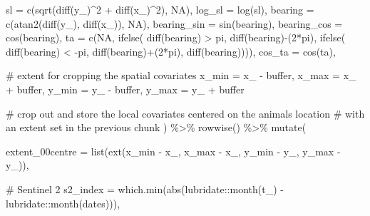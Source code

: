\documentclass[
  letterpaper,
  DIV=11,
  numbers=noendperiod]{scrartcl}
\newenvironment{Shaded}{\begin{snugshade}}{\end{snugshade}}
\newcommand{\AttributeTok}[1]{\textcolor[rgb]{0.40,0.45,0.13}{#1}}
\newcommand{\CommentTok}[1]{\textcolor[rgb]{0.37,0.37,0.37}{#1}}
\newcommand{\ConstantTok}[1]{\textcolor[rgb]{0.56,0.35,0.01}{#1}}
\newcommand{\DecValTok}[1]{\textcolor[rgb]{0.68,0.00,0.00}{#1}}
\newcommand{\FunctionTok}[1]{\textcolor[rgb]{0.28,0.35,0.67}{#1}}
\newcommand{\NormalTok}[1]{\textcolor[rgb]{0.00,0.23,0.31}{#1}}
\newcommand{\SpecialCharTok}[1]{\textcolor[rgb]{0.37,0.37,0.37}{#1}}
\begin{document}
\begin{Shaded}
\begin{Highlighting}[]
    \AttributeTok{sl =} \FunctionTok{c}\NormalTok{(}\FunctionTok{sqrt}\NormalTok{(}\FunctionTok{diff}\NormalTok{(y\_)}\SpecialCharTok{\^{}}\DecValTok{2} \SpecialCharTok{+} \FunctionTok{diff}\NormalTok{(x\_)}\SpecialCharTok{\^{}}\DecValTok{2}\NormalTok{), }\ConstantTok{NA}\NormalTok{),}
    \AttributeTok{log\_sl =} \FunctionTok{log}\NormalTok{(sl),}
    \AttributeTok{bearing =} \FunctionTok{c}\NormalTok{(}\FunctionTok{atan2}\NormalTok{(}\FunctionTok{diff}\NormalTok{(y\_), }\FunctionTok{diff}\NormalTok{(x\_)), }\ConstantTok{NA}\NormalTok{),}
    \AttributeTok{bearing\_sin =} \FunctionTok{sin}\NormalTok{(bearing),}
    \AttributeTok{bearing\_cos =} \FunctionTok{cos}\NormalTok{(bearing),}
    \AttributeTok{ta =} \FunctionTok{c}\NormalTok{(}\ConstantTok{NA}\NormalTok{, }\FunctionTok{ifelse}\NormalTok{(}
      \FunctionTok{diff}\NormalTok{(bearing) }\SpecialCharTok{\textgreater{}}\NormalTok{ pi, }\FunctionTok{diff}\NormalTok{(bearing)}\SpecialCharTok{{-}}\NormalTok{(}\DecValTok{2}\SpecialCharTok{*}\NormalTok{pi), }\FunctionTok{ifelse}\NormalTok{(}
        \FunctionTok{diff}\NormalTok{(bearing) }\SpecialCharTok{\textless{}} \SpecialCharTok{{-}}\NormalTok{pi, }\FunctionTok{diff}\NormalTok{(bearing)}\SpecialCharTok{+}\NormalTok{(}\DecValTok{2}\SpecialCharTok{*}\NormalTok{pi), }\FunctionTok{diff}\NormalTok{(bearing)))),}
    \AttributeTok{cos\_ta =} \FunctionTok{cos}\NormalTok{(ta),}
      
    \CommentTok{\# extent for cropping the spatial covariates}
    \AttributeTok{x\_min =}\NormalTok{ x\_ }\SpecialCharTok{{-}}\NormalTok{ buffer,}
    \AttributeTok{x\_max =}\NormalTok{ x\_ }\SpecialCharTok{+}\NormalTok{ buffer,}
    \AttributeTok{y\_min =}\NormalTok{ y\_ }\SpecialCharTok{{-}}\NormalTok{ buffer,}
    \AttributeTok{y\_max =}\NormalTok{ y\_ }\SpecialCharTok{+}\NormalTok{ buffer}
    
  
    \CommentTok{\# crop out and store the local covariates centered on the animal\textquotesingle{}s location }
    \CommentTok{\# with an extent set in the previous chunk}
\NormalTok{  ) }\SpecialCharTok{\%\textgreater{}\%} \FunctionTok{rowwise}\NormalTok{() }\SpecialCharTok{\%\textgreater{}\%} \FunctionTok{mutate}\NormalTok{(}

    \AttributeTok{extent\_00centre =} \FunctionTok{list}\NormalTok{(}\FunctionTok{ext}\NormalTok{(x\_min }\SpecialCharTok{{-}}\NormalTok{ x\_, x\_max }\SpecialCharTok{{-}}\NormalTok{ x\_, y\_min }\SpecialCharTok{{-}}\NormalTok{ y\_, y\_max }\SpecialCharTok{{-}}\NormalTok{ y\_)),}
    
    \CommentTok{\# Sentinel 2}
    \AttributeTok{s2\_index =} \FunctionTok{which.min}\NormalTok{(}\FunctionTok{abs}\NormalTok{(lubridate}\SpecialCharTok{::}\FunctionTok{month}\NormalTok{(t\_) }\SpecialCharTok{{-}}\NormalTok{ lubridate}\SpecialCharTok{::}\FunctionTok{month}\NormalTok{(dates))),}
    

\end{Highlighting}
\end{Shaded}
\end{document}

